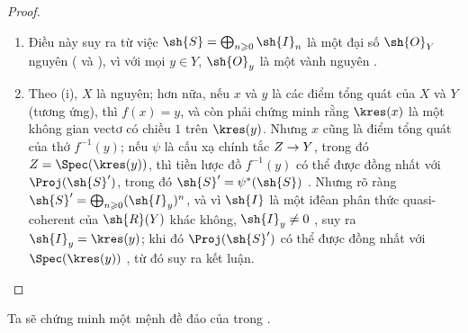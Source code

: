 \documentclass[oneside,10pt]{amsart}
\makeatletter
\renewcommand{\geq}{\geqslant}
\newcommand{\ega@arrow}[2]{\mathchoice{#1}{#2}{#2}{#2}}
\renewcommand{\to}{\ega@arrow{\longrightarrow}{\rightarrow}}
\makeatother
\begin{document}
\begin{proof}
\medskip\noindent
\begin{enumerate}
    \item[\rm{(i)}] Điều này suy ra từ việc $\sh{S}=\bigoplus_{n\geq0}\sh{I}_n$ là một đại số $\sh{O}_Y$ nguyên ( và ), vì với mọi $y\in Y$, $\sh{O}_y$ là một vành nguyên .
    \item[\rm{(ii)}] Theo (i), $X$ là nguyên; hơn nữa, nếu $x$ và $y$ là các điểm tổng quát của $X$ và $Y$ (tương ứng), thì $f(x)=y$, và còn phải chứng minh rằng $\kres(x)$ là một không gian vectơ có chiều $1$ trên $\kres(y)$.
        Nhưng $x$ cũng là điểm tổng quát của thớ $f^{-1}(y)$; nếu $\psi$ là cấu xạ chính tắc $Z\to Y$, trong đó $Z=\Spec(\kres(y))$, thì tiền lược đồ $f^{-1}(y)$ có thể được đồng nhất với $\Proj(\sh{S}')$, trong đó $\sh{S}'=\psi^*(\sh{S})$ .
        Nhưng rõ ràng $\sh{S}'=\bigoplus_{n\geq0}(\sh{I}_y)^n$, và vì $\sh{I}$ là một iđêan phân thức quasi-coherent của $\sh{R}(Y)$ khác không, $\sh{I}_y\neq0$ , suy ra $\sh{I}_y=\kres(y)$;
        khi đó $\Proj(\sh{S}')$ có thể được đồng nhất với $\Spec(\kres(y))$ , từ đó suy ra kết luận.
\end{enumerate}
\end{proof}

Ta sẽ chứng minh một mệnh đề đảo của  trong .
\end{document}
